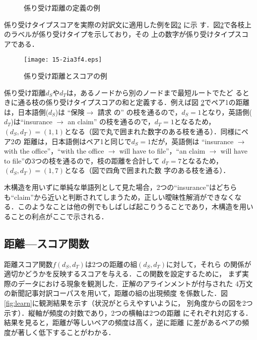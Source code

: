 \documentclass[japanese]{jnlp_1.4}
\begin{document}
\begin{figure}[b]
 \begin{center}

 \end{center}
 \caption{係り受け距離の定義の例}
 \label{fig:dep_dist}
\end{figure}

係り受けタイプスコアを実際の対訳文に適用した例を図\ref{fig:exgood} に示
す．図\ref{fig:exgood}で各枝上のラベルが係り受けタイプを示しており，その
上の数字が係り受けタイプスコアである．


\begin{figure}[t]
 \begin{center}
  \texttt{[image: 15-2ia3f4.eps]}
  \caption{係り受け距離とスコアの例}
  \label{fig:exgood}
 \end{center}
\end{figure}

係り受け距離$d_S$や$d_T$は，あるノードから別のノードまで最短ルートでたど
るときに通る枝の係り受けタイプスコアの和と定義する．例えば図
\ref{fig:exgood}でペア1の距離は，日本語側($d_S$)は ``保険$\rightarrow$ 
請求 の'' の枝を通るので，$d_S = 1$となり，英語側($d_T$)は``insurance
$\rightarrow$ an claim'' の枝を通るので，$d_T = 1$となるため，$(d_S,
d_T) = (1, 1)$となる（図で丸で囲まれた数字のある枝を通る）．同様にペア2の
距離は，日本語側はペア1と同じで$d_S = 1$だが，英語側は ``insurance
$\rightarrow$ with the office''，``with the office
$\rightarrow$ will have to file''，``an claim
$\rightarrow$ will have to file''の3つの枝を通るので，枝の距離を合計して
$d_T = 7$となるため，$(d_S, d_T) = (1, 7)$となる（図で四角で囲まれた数
字のある枝を通る）．


木構造を用いずに単純な単語列として見た場合，2つの``insurance''はどちら
も``claim''から近いと判断されてしまうため，正しい曖昧性解消ができなくな
る．このようなことは他の例でもしばしば起こりうることであり，木構造を用い
ることの利点がここで示される．


\subsection{距離—スコア関数}
\label{function}

距離スコア関数$f(d_S, d_T)$は2つの距離の組$(d_S, d_T)$に対して，それら
の関係が適切かどうかを反映するスコアを与える．この関数を設定するために，
まず実際のデータにおける現象を観測した．正解のアラインメントが付与された
4万文の新聞記事対訳コーパス\cite{Uchimoto04}を用いて，距離の組の出現頻度
を係数した．図\ref{fig:learn}に観測結果を示す（状況がとらえやすいように，
別角度からの図を2つ示す）．縦軸が頻度の対数であり，2つの横軸は2つの距離
にそれぞれ対応する．結果を見ると，距離が等しいペアの頻度は高く，逆に距離
に差があるペアの頻度が著しく低下することがわかる．
\end{document}

